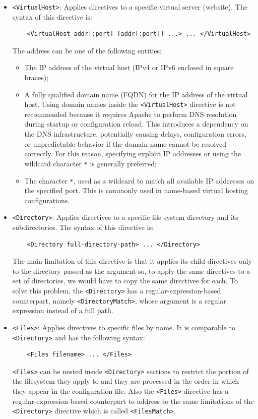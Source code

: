 \documentclass{scrbook}
\begin{document}
	\begin{itemize}
		\item
		\texttt{<VirtualHost>}: Applies directives to a specific virtual server (website). The syntax of this directive is:
		\begin{lstlisting}
	<VirtualHost addr[:port] [addr[:port]] ...> ... </VirtualHost>
		\end{lstlisting}
		The address can be one of the following entities:
		\begin{itemize}
			\item The IP address of the virtual host (IPv4 or IPv6 enclosed in square braces);
			
			\item A fully qualified domain name (FQDN) for the IP address of the virtual host. Using domain names inside the \texttt{<VirtualHost>} directive is not recommended because it requires Apache to perform DNS resolution during startup or configuration reload. This introduces a dependency on the DNS infrastructure, potentially causing delays, configuration errors, or unpredictable behavior if the domain name cannot be resolved correctly. For this reason, specifying explicit IP addresses or using the wildcard character \texttt{*} is generally preferred;
			
			\item The character \texttt{*}, used as a wildcard to match all available IP addresses on the specified port. This is commonly used in name-based virtual hosting configurations.
		\end{itemize}
		
		\item
		\texttt{<Directory>}: Applies directives to a specific file system directory and its subdirectories. The syntax of this directive is:
		\begin{lstlisting}
	<Directory full-directory-path> ... </Directory>
		\end{lstlisting}
		The main limitation of this directive is that it applies its child directives only to the directory passed as the argument so, to apply the same directives to a set of directories, we would have to copy the same directives for each. To solve this problem, the \texttt{<Directory>} has a regular-expression-based counterpart, namely \texttt{<DirectoryMatch>}, whose argument is a regular expression instead of a full path.
		
		\item
		\texttt{<Files>}: Applies directives to specific files by name. It is comparable to \texttt{<Directory>} and has the following syntax:
		\begin{lstlisting}
	<Files filename> ... </Files>
		\end{lstlisting}
		\texttt{<Files>} can be nested inside \texttt{<Directory>} sections to restrict the portion of the filesystem they apply to and they are processed in the order in which they appear in the configuration file. Also the \texttt{<Files>} directive has a regular-expression-based counterpart to address to the same limitations of the \texttt{<Directory>} directive which is called \texttt{<FilesMatch>}.
		

\end{itemize}
\end{document}
